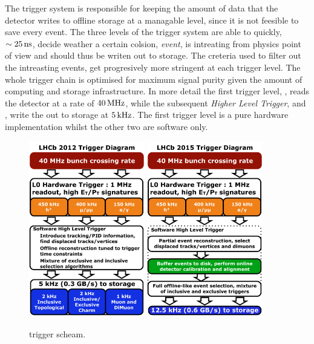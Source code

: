 The trigger system is responsible for keeping the amount of data that the detector writes to offline storage
at a managable level, since it is not feesible to save every event. The three levels of the \lhcb trigger system
are able to quickly, $\sim 25{\rm \,ns}$, decide weather a certain colsion, {\it event}, is intreating from physics point
of view and should thus be writen out to storage. The creteria used to filter out the intreasting events, get
progresively more stringent at each trigger level. The whole trigger chain is optimised for maximum
signal purity given the amount of computing and storage infrastructure. In more detail the first trigger
level, \lzero, reads the detector at a rate of $40{\rm \,MHz}$, while the subsequent {\it Higher Level Trigger},
\hltone and \hlttwo, write the out to storage at $5{\rm \,kHz}$. The first trigger level is a pure hardware
implementation whilst the other two are software only.

\begin{figure}[t]
  \centering
  \includegraphics[width=0.45\textwidth]{Figures/Chapter2/LHCb_Trigger_RunIAlgDetail_May2015}
  \hspace{0.2cm}
  \includegraphics[width=0.45\textwidth]{Figures/Chapter2/LHCb_Trigger_RunII_May2015}
  \caption{\runone trigger scheam.}
  \label{run_one_trigger}
\end{figure}

